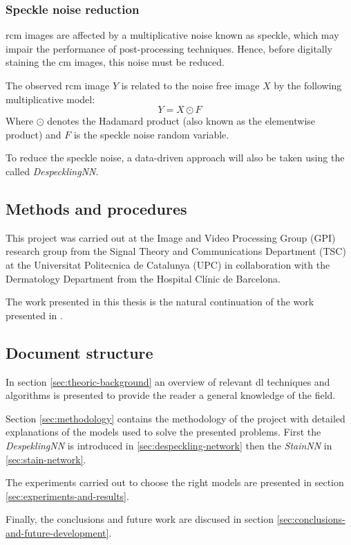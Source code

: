 \documentclass[../main.tex]{subfiles}
\begin{document}
% 
% 
% 

\subsubsection{Speckle noise reduction}\label{sec:speckle-noise}
\gls{rcm} images are affected by a multiplicative noise known as speckle,
which may impair the performance of post-processing techniques.
Hence, before digitally staining the \gls{cm} images, this noise must be reduced.

The observed \gls{rcm} image $Y$ is related to the noise free image $X$ by
the following multiplicative model:
\begin{equation} \label{eq:speckle-model}
	Y = X \odot F
\end{equation}
Where $\odot$ denotes the Hadamard product (also known as the elementwise product)
and $F$ is the speckle noise random variable.

To reduce the speckle noise, a data-driven approach will also be taken using
the called \emph{DespecklingNN}.

\subsection{Methods and procedures}
\label{sec:methods-and-procedures}
This project was carried out at the Image and Video Processing Group (GPI) research
group from the Signal Theory and Communications Department (TSC) at the Universitat
Politecnica de Catalunya (UPC) in collaboration with the Dermatology Department from
the Hospital Clínic de Barcelona.

The work presented in this thesis is the natural continuation of the work presented
in \cite{Combalia2019}.

\subsection{Document structure}
In section \ref{sec:theoric-background} an overview of relevant \gls{dl} techniques and algorithms
is presented to provide the reader a general knowledge of the field.

Section \ref{sec:methodology} contains the methodology of the project with detailed
explanations of the models used to solve the presented problems. First the
\emph{DespeklingNN} is introduced in \ref{sec:despeckling-network} then the
\emph{StainNN} in \ref{sec:stain-network}.

The experiments carried out to choose the right models are presented in section
\ref{sec:experiments-and-results}.

Finally, the conclusions and future work are discused in section
\ref{sec:conclusions-and-future-development}.
\end{document}
